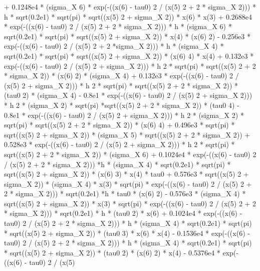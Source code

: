 \begin{maplegroup}
+ 0.1248e4 * (sigma\_X  6) * exp(-((x(6) - tau0)  2 / (x(5)  2 + 2 * sigma\_X  2))) * h * sqrt(0.2e1) * sqrt(pi) * sqrt((x(5) 2 + sigma\_X  2)) * x(6) * x(3) + 0.2688e4 * exp(-((x(6) - tau0)  2 / (x(5)  2 + 2 * sigma\_X  2))) * h * (sigma\_X  6) * sqrt(0.2e1) * sqrt(pi) * sqrt((x(5)  2 + sigma\_X  2)) * x(4) * (x(6)  2) - 0.256e3 * exp(-((x(6) - tau0)  2 / (x(5)  2 + 2 *sigma\_X  2))) * h * (sigma\_X  4) * sqrt(0.2e1) * sqrt(pi) * sqrt((x(5)  2 + sigma\_X  2)) * (x(6)  4) * x(4) + 0.132e3 * exp(-((x(6) - tau0)  2 / (x(5)  2 + sigma\_X  2))) * h  2 * sqrt(pi) * sqrt((x(5)  2 + 2 * sigma\_X  2)) * (x(6)  2) * (sigma\_X  4) + 0.132e3 * exp(-((x(6) - tau0)  2 / (x(5)  2 + sigma\_X  2))) * h  2 * sqrt(pi) * sqrt((x(5)  2 + 2 * sigma\_X  2)) * (tau0  2) * (sigma\_X  4) - 0.8e1 * exp(-((x(6) - tau0)  2 / (x(5)  2 + sigma\_X  2))) * h  2 * (sigma\_X  2) * sqrt(pi) *sqrt((x(5)  2 + 2 * sigma\_X  2)) * (tau0  4) - 0.8e1 * exp(-((x(6) - tau0)  2 / (x(5)  2 + sigma\_X  2))) * h  2 * (sigma\_X  2) * sqrt(pi) * sqrt((x(5)  2 + 2 * sigma\_X  2)) * (x(6)  4) + 0.496e3 * sqrt(pi) * sqrt((x(5)  2 + sigma\_X  2)) * (sigma\_X  5) * sqrt((x(5)  2 + 2 * sigma\_X  2)) + 0.528e3 * exp(-((x(6) - tau0)  2 / (x(5)  2 + sigma\_X  2))) * h  2 * sqrt(pi) * sqrt((x(5)  2 + 2 * sigma\_X  2)) * (sigma\_X  6) + 0.1024e4 * exp(-((x(6) - tau0)  2 / (x(5)  2 + 2 * sigma\_X  2))) *h * (sigma\_X  4) * sqrt(0.2e1) * sqrt(pi) * sqrt((x(5)  2 + sigma\_X  2)) * (x(6)  3) * x(4) * tau0 + 0.576e3 * sqrt((x(5)  2 + sigma\_X  2)) * (sigma\_X  4) * x(3) * sqrt(pi) * exp(-((x(6) - tau0)  2 / (x(5)  2 + 2 * sigma\_X  2))) * sqrt(0.2e1) *h * tau0 * (x(6)  2) - 0.576e3 * (sigma\_X  4) * sqrt((x(5)  2 + sigma\_X  2)) * x(3) * sqrt(pi) * exp(-((x(6) - tau0)  2 / (x(5)  2 + 2 * sigma\_X  2))) * sqrt(0.2e1) * h * (tau0  2) * x(6) + 0.1024e4 * exp(-((x(6) - tau0)  2 / (x(5)  2 + 2 * sigma\_X  2))) * h * (sigma\_X  4) * sqrt(0.2e1) * sqrt(pi) * sqrt((x(5)  2 + sigma\_X  2)) * (tau0  3) * x(6) * x(4) - 0.1536e4 * exp(-((x(6) - tau0)  2 / (x(5)  2 + 2 * sigma\_X  2))) * h * (sigma\_X  4) * sqrt(0.2e1) * sqrt(pi) * sqrt((x(5)  2 + sigma\_X 2)) * (tau0  2) * (x(6)  2) * x(4) - 0.5376e4 * exp(-((x(6) - tau0)  2 / (x(5) 
\end{maplegroup}
